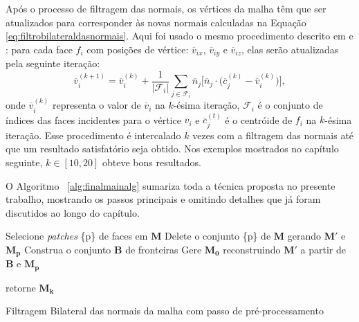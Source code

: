 Após o processo de filtragem das normais, os vértices da malha têm que ser atualizados para corresponder às novas normais calculadas na Equação \ref{eq:filtrobilateraldasnormais}. Aqui foi usado o mesmo procedimento descrito em \cite{zhang2015guided} e \cite{sun2007fast}: para cada face $f_i$ com posições de vértice: $\overline{v}_{ix}$, $\overline{v}_{iy}$ e $\overline{v}_{iz}$, elas serão atualizadas pela seguinte iteração:
\begin{equation}
	\overline{v}^{(k+1)}_{i} = \overline{v}^{(k)}_{i} + \frac{1}{|\mathcal{F}_i|} \sum_{j \in \mathcal{F}_i}{ \overline{n}_j \Big[ \overline{n}_j \cdot \Big( \overline{c}^{(k)}_j - \overline{v}^{(k)}_i \Big) \Big] },
\end{equation}
onde $\overline{v}^{(k)}_{i}$ representa o valor de $\overline{v}_{i}$ na $k$-ésima iteração, $\mathcal{F}_i$ é o conjunto de índices das faces incidentes para o vértice $\overline{v}_{i}$ e $\overline{c}^{(t)}_j$ é o centróide de $f_i$ na $k$-ésima iteração. Esse procedimento é intercalado $k$ vezes com a filtragem das normais até que um resultado satisfatório seja obtido. Nos exemplos mostrados no capítulo seguinte, $k \in [10, 20]$ obteve bons resultados.

O Algoritmo ~\ref{alg:finalmainalg} sumariza toda a técnica proposta no presente trabalho, mostrando os passos principais e omitindo detalhes que já foram discutidos ao longo do capítulo.

\begin{algorithm}[]
\BlankLine

    Selecione \textit{patches} \{p\} de faces em $\mathbf{M}$\;
    Delete o conjunto \{p\} de $\mathbf{M}$ gerando $\mathbf{M'}$ e $\mathbf{M_p}$\;
    Construa o conjunto $\mathbf{B}$ de fronteiras\;
    Gere $\mathbf{M_0}$ reconstruindo $\mathbf{M'}$ a partir de $\mathbf{B}$ e $\mathbf{M_p}$\;
    
    retorne $\mathbf{M_{k }}$\;
\caption{Filtragem Bilateral das normais da malha com passo de pré-processamento}
\label{alg:finalmainalg}
\end{algorithm}
